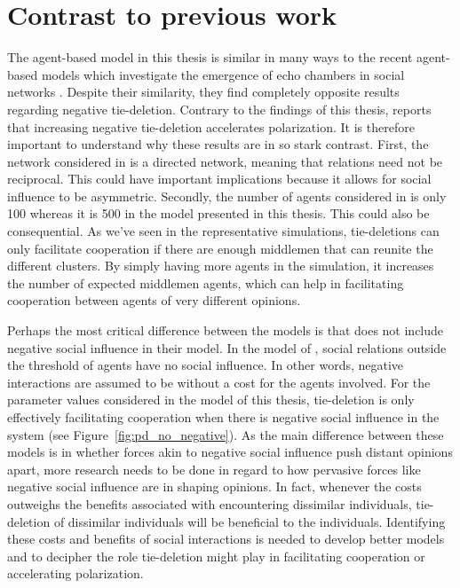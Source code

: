 \documentclass[11pt]{article}
\begin{document}
\section{Contrast to previous work}
The agent-based model in this thesis is similar in many ways to the recent agent-based models which investigate the emergence of echo chambers in social networks \cite{sasahara_social_2021}. Despite their similarity, they find completely opposite results regarding negative tie-deletion. Contrary to the findings of this thesis,  reports that increasing negative tie-deletion accelerates polarization. It is therefore important to understand why these results are in so stark contrast. First, the network considered in  is a directed network, meaning that relations need not be reciprocal. This could have important implications because it allows for social influence to be asymmetric. Secondly, the number of agents considered in  is only 100 whereas it is 500 in the model presented in this thesis. This could also be consequential. As we've seen in the representative simulations, tie-deletions can only facilitate cooperation if there are enough middlemen that can reunite the different clusters. By simply having more agents in the simulation, it increases the number of expected middlemen agents, which can help in facilitating cooperation between agents of very different opinions. 

Perhaps the most critical difference between the models is that  does not include negative social influence in their model. In the model of , social relations outside the threshold of agents have no social influence. In other words, negative interactions are assumed to be without a cost for the agents involved. For the parameter values considered in the model of this thesis, tie-deletion is only effectively facilitating cooperation when there is negative social influence in the system (see Figure~\ref{fig:pd_no_negative}). 
As the main difference between these models is in whether forces akin to negative social influence push distant opinions apart, more research needs to be done in regard to how pervasive forces like negative social influence are in shaping opinions. In fact, whenever the costs outweighs the benefits associated with encountering dissimilar individuals, tie-deletion of dissimilar individuals will be beneficial to the individuals. Identifying these costs and benefits of social interactions is needed to develop better models and to decipher the role tie-deletion might play in facilitating cooperation or accelerating polarization. 
\end{document}
